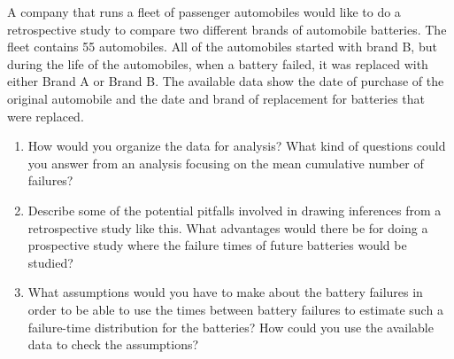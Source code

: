 \begin{exercise}
A company that runs a fleet of passenger automobiles would like to do
a retrospective study to compare two different brands of automobile
batteries.  The fleet contains 55 automobiles. All 
of the automobiles started with brand
B, but during the life of the automobiles, when a battery failed, it
was replaced with either Brand A or Brand B. The available data show
the date of purchase of the original automobile and the date and brand of
replacement for batteries that were replaced.
\begin{enumerate}
\item
How would you organize the data for analysis?
What kind of questions could you answer from an analysis
focusing on the mean cumulative number of failures?
\item
Describe some of the potential pitfalls involved in drawing inferences
from a retrospective study like this. What advantages would there
be for doing a prospective study where the failure times of future
batteries would be studied?
\item
What assumptions would you have to make about the battery failures in
order to be able to use the times between battery failures to estimate
such a failure-time distribution for the batteries?  How could you
use the available data to check the assumptions?
\end{enumerate}
\end{exercise}

